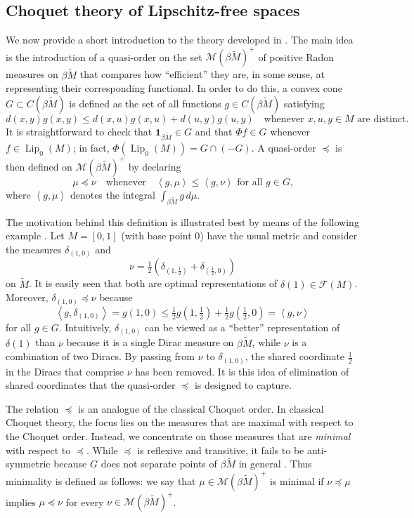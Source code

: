 \documentclass[a4paper,10pt]{amsart}
\DeclareMathOperator{\Lip}{Lip}                             %
\newcommand{\duality}[1]{\left<{#1}\right>}                 %
\newcommand{\lipfree}[1]{\mathcal{F}({#1})}                 %
\newcommand{\meas}[1]{\mathcal{M}({#1})}                    %
\newcommand{\wt}[1]{\widetilde{#1}}                         %
\newcommand{\bwt}[1]{\beta\wt{#1}}                          %
\renewcommand{\leq}{\leqslant}
\theoremstyle{plain}
\theoremstyle{definition}
\theoremstyle{remark}
\begin{document}
\subsection{Choquet theory of Lipschitz-free spaces}
\label{sec:choquet}

We now provide a short introduction to the theory developed in \cite{Smith24}. The main idea is the introduction of a quasi-order on the set $\meas{\bwt{M}}^+$ of positive Radon measures on $\bwt{M}$ that compares how ``efficient'' they are, in some sense, at representing their corresponding functional. In order to do this, a convex cone $G\subset C(\bwt{M})$ is defined as the set of all functions $g \in C(\bwt{M})$ satisfying
\begin{equation}\label{G-function}
d(x,y)g(x,y) \leq d(x,u)g(x,u) + d(u,y)g(u,y) \quad\text{whenever $x,u,y \in M$ are distinct.}
\end{equation}
It is straightforward to check that $\mathbf{1}_{\bwt{M}} \in G$ and that $\Phi f\in G$ whenever $f \in \Lip_0(M)$; in fact, $\Phi(\Lip_0(M))=G \cap (-G)$.
A quasi-order $\preccurlyeq$ is then defined on $\meas{\bwt{M}}^+$ by declaring
$$
\mu\preccurlyeq\nu \quad\text{whenever}\quad \duality{g,\mu} \leq \duality{g,\nu} \text{ for all $g\in G$,}
$$
where $\duality{g,\mu}$ denotes the integral $\int_{\bwt{M}} g\,d\mu$. 

The motivation behind this definition is illustrated best by means of the following example \cite[Example 3.5]{Smith24}.
Let $M=[0,1]$ (with base point $0$) have the usual metric and consider the measures $\delta_{(1,0)}$ and
$$
\nu = \tfrac{1}{2}(\delta_{(1,\frac{1}{2})} + \delta_{(\frac{1}{2},0)})
$$
on $\wt{M}$. It is easily seen that both are optimal representations of $\delta(1)\in\lipfree{M}$. Moreover, $\delta_{(1,0)} \preccurlyeq \nu$ because
$$
\duality{g,\delta_{(1,0)}} = g(1,0) \leq \tfrac{1}{2}g(1,\tfrac{1}{2}) + \tfrac{1}{2}g(\tfrac{1}{2},0) = \duality{g,\nu}
$$
for all $g \in G$. Intuitively, $\delta_{(1,0)}$ can be viewed as a ``better'' representation of $\delta(1)$ than $\nu$ because it is a single Dirac measure on $\bwt{M}$, while $\nu$ is a combination of two Diracs. By passing from $\nu$ to $\delta_{(1,0)}$, the shared coordinate $\frac{1}{2}$ in the Diracs that comprise $\nu$ has been removed. It is this idea of elimination of shared coordinates that the quasi-order $\preccurlyeq$ is designed to capture.

The relation $\preccurlyeq$ is an analogue of the classical Choquet order. In classical Choquet theory, the focus lies on the measures that are maximal with respect to the Choquet order. Instead, we concentrate on those measures that are \emph{minimal} with respect to $\preccurlyeq$. While $\preccurlyeq$ is reflexive and transitive, it fails to be anti-symmetric because $G$ does not separate points of $\bwt{M}$ in general \cite[Example 3.2]{Smith24}. Thus minimality is defined as follows: we say that $\mu \in \meas{\bwt{M}}^+$ is minimal if $\nu \preccurlyeq \mu$ implies $\mu \preccurlyeq \nu$ for every $\nu \in \meas{\bwt{M}}^+$.
\end{document}
